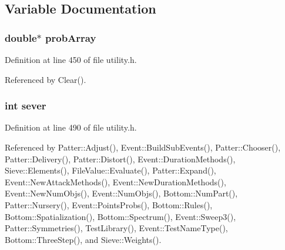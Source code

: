 \subsection{Variable Documentation}
\subsubsection{\setlength{\rightskip}{0pt plus 5cm}double$\ast$ {\bf prob\-Array}}\label{utility_8h_a0}




Definition at line 450 of file utility.h.

Referenced by Clear().
\subsubsection{\setlength{\rightskip}{0pt plus 5cm}int {\bf sever}}\label{utility_8h_a1}




Definition at line 490 of file utility.h.

Referenced by Patter::Adjust(), Event::Build\-Sub\-Events(), Patter::Chooser(), Patter::Delivery(), Patter::Distort(), Event::Duration\-Methods(), Sieve::Elements(), File\-Value::Evaluate(), Patter::Expand(), Event::New\-Attack\-Methods(), Event::New\-Duration\-Methods(), Event::New\-Num\-Objs(), Event::Num\-Objs(), Bottom::Num\-Part(), Patter::Nursery(), Event::Points\-Probs(), Bottom::Rules(), Bottom::Spatialization(), Bottom::Spectrum(), Event::Sweep3(), Patter::Symmetries(), Test\-Library(), Event::Test\-Name\-Type(), Bottom::Three\-Step(), and Sieve::Weights().